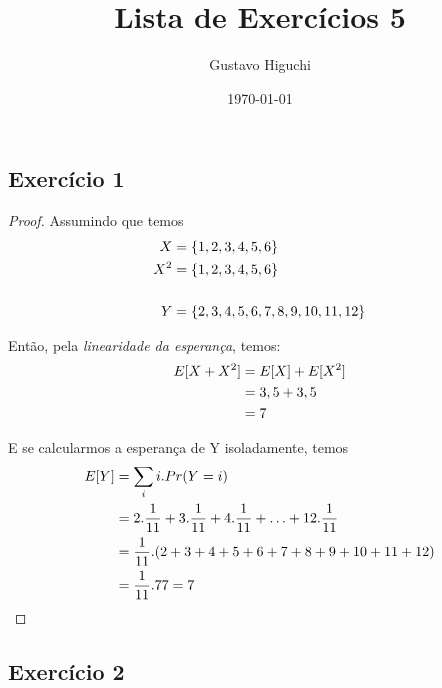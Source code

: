 \documentclass{article}
\title{Lista de Exercícios 5}
\author{Gustavo Higuchi}
\date{\today}
\begin{document}
\maketitle

\tableofcontents
\newpage


\chapter{}
\section{Exercício 1}
\begin{proof}
    Assumindo que temos
    \begin{equation}
    \notag
        \begin{split}
            X &= \{1,2,3,4,5,6\}\\
            X^2 &= \{1,2,3,4,5,6\}\\
            &\\
            Y &=\{2,3,4,5,6,7,8,9,10,11,12\}
        \end{split}
    \end{equation}

    Então, pela \textit{linearidade da esperança}, temos:
    \begin{equation}
    \notag
        \begin{split}
            E[X+X^2]& = E[X] + E[X^2]\\
            & = 3,5 + 3,5\\
            & = 7
        \end{split}
    \end{equation}

    E se calcularmos a esperança de Y isoladamente, temos
    \begin{equation}
    \notag
        \begin{split}
            E[Y] &= \sum\limits_{i} i.Pr(Y = i)\\
            &= 2.\dfrac{1}{11} + 3.\dfrac{1}{11} + 4.\dfrac{1}{11} + \ldots + 12.\dfrac{1}{11}\\
            &= \dfrac{1}{11}.(2+3+4+5+6+7+8+9+10+11+12)\\
            & = \dfrac{1}{11}. 77 = 7
        \end{split}
    \end{equation}
\end{proof}
\section{Exercício 2}
\end{document}
